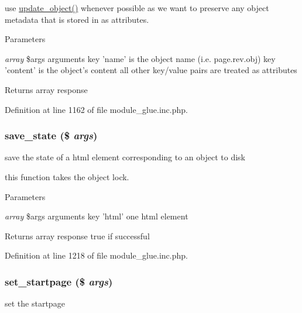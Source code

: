 use \hyperlink{module__glue_8inc_8php_a4aed316adcde13b40c9fc1b35e6537a4}{update\_\-object()} whenever possible as we want to preserve any object metadata that is stored in as attributes. 
\begin{DoxyParams}{Parameters}
\item[{\em array}]\$args arguments key 'name' is the object name (i.e. page.rev.obj) key 'content' is the object's content all other key/value pairs are treated as attributes \end{DoxyParams}
\begin{DoxyReturn}{Returns}
array response 
\end{DoxyReturn}


Definition at line 1162 of file module\_\-glue.inc.php.

\hypertarget{module__glue_8inc_8php_a60d03d7a0d8783e926835f0aa6cff698}{
\subsubsection[{save\_\-state}]{\setlength{\rightskip}{0pt plus 5cm}save\_\-state (\$ {\em args})}}
\label{module__glue_8inc_8php_a60d03d7a0d8783e926835f0aa6cff698}
save the state of a html element corresponding to an object to disk

this function takes the object lock. 
\begin{DoxyParams}{Parameters}
\item[{\em array}]\$args arguments key 'html' one html element \end{DoxyParams}
\begin{DoxyReturn}{Returns}
array response true if successful 
\end{DoxyReturn}


Definition at line 1218 of file module\_\-glue.inc.php.

\hypertarget{module__glue_8inc_8php_aafa7a8fa046ff6119cb7506d68edf787}{
\subsubsection[{set\_\-startpage}]{\setlength{\rightskip}{0pt plus 5cm}set\_\-startpage (\$ {\em args})}}
\label{module__glue_8inc_8php_aafa7a8fa046ff6119cb7506d68edf787}
set the startpage


